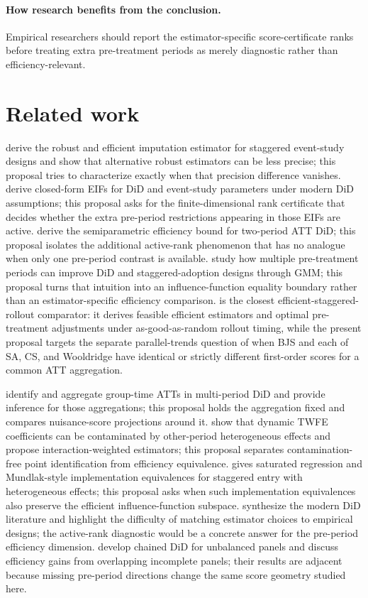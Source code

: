 \documentclass[11pt]{article}
\theoremstyle{definition}
\theoremstyle{plain}
\theoremstyle{remark}
\begin{document}
\paragraph{How research benefits from the conclusion.}
Empirical researchers should report the estimator-specific score-certificate
ranks before treating extra pre-treatment periods as merely diagnostic rather
than efficiency-relevant.

\section{Related work}
\citet{BorusyakJaravelSpiess2024} derive the robust and efficient imputation
estimator for staggered event-study designs and show that alternative robust
estimators can be less precise; this proposal tries to characterize exactly
when that precision difference vanishes.  \citet{ChenSantAnnaXie2025} derive
closed-form EIFs for DiD and event-study parameters under modern DiD
assumptions; this proposal asks for the finite-dimensional rank certificate
that decides whether the extra pre-period restrictions appearing in those EIFs
are active.  \citet{SantAnnaZhao2020} derive the semiparametric efficiency
bound for two-period ATT DiD; this proposal isolates the additional active-rank
phenomenon that has no analogue when only one pre-period contrast is available.
\citet{EgamiYamauchi2023} study how multiple pre-treatment periods can improve
DiD and staggered-adoption designs through GMM; this proposal turns that
intuition into an influence-function equality boundary rather than an
estimator-specific efficiency comparison.
\citet{RothSantAnna2023Efficient} is the closest efficient-staggered-rollout
comparator: it derives feasible efficient estimators and optimal pre-treatment
adjustments under as-good-as-random rollout timing, while the present proposal
targets the separate parallel-trends question of when BJS and each of SA, CS,
and Wooldridge have identical or strictly different first-order scores for a
common ATT aggregation.

\citet{CallawaySantAnna2021} identify and aggregate group-time ATTs in
multi-period DiD and provide inference for those aggregations; this proposal
holds the aggregation fixed and compares nuisance-score projections around it.
\citet{SunAbraham2021} show that dynamic TWFE coefficients can be contaminated
by other-period heterogeneous effects and propose interaction-weighted
estimators; this proposal separates contamination-free point identification
from efficiency equivalence.  \citet{Wooldridge2021} gives saturated
regression and Mundlak-style implementation equivalences for staggered entry
with heterogeneous effects; this proposal asks when such implementation
equivalences also preserve the efficient influence-function subspace.
\citet{RothSantAnnaBilinskiPoe2023} synthesize the modern DiD literature and
highlight the difficulty of matching estimator choices to empirical designs;
the active-rank diagnostic would be a concrete answer for the pre-period
efficiency dimension.  \citet{BellegoBenatiaDortetBernadet2025} develop chained
DiD for unbalanced panels and discuss efficiency gains from overlapping
incomplete panels; their results are adjacent because missing pre-period
directions change the same score geometry studied here.
\end{document}
